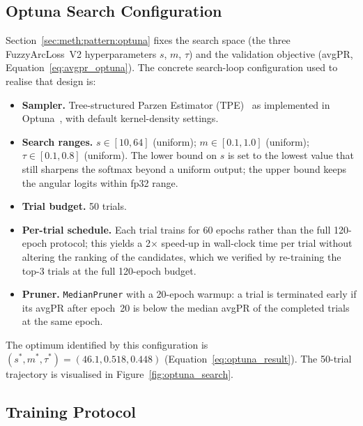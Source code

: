 \subsection{Optuna Search Configuration}
\label{sec:impl:pattern:optuna_config}

Section~\ref{sec:meth:pattern:optuna} fixes the search space (the
three FuzzyArcLoss~V2 hyperparameters $s$, $m$, $\tau$) and the
validation objective (avgPR, Equation~\ref{eq:avgpr_optuna}).
The concrete search-loop configuration used to realise that design is:
\begin{itemize}
    \item \textbf{Sampler.} Tree-structured Parzen Estimator
    (TPE)~\cite{bergstra2011tpe} as implemented in
    Optuna~\cite{akiba2019optuna}, with default kernel-density
    settings.
    \item \textbf{Search ranges.}
    $s \in [10, 64]$ (uniform); $m \in [0.1, 1.0]$ (uniform);
    $\tau \in [0.1, 0.8]$ (uniform).
    The lower bound on $s$ is set to the lowest value that still
    sharpens the softmax beyond a uniform output; the upper bound
    keeps the angular logits within fp32 range.
    \item \textbf{Trial budget.} 50 trials.
    \item \textbf{Per-trial schedule.} Each trial trains for 60 epochs
    rather than the full 120-epoch protocol; this yields a 2$\times$
    speed-up in wall-clock time per trial without altering the
    ranking of the candidates, which we verified by re-training the
    top-3 trials at the full 120-epoch budget.
    \item \textbf{Pruner.} \texttt{MedianPruner} with a 20-epoch
    warmup: a trial is terminated early if its avgPR after epoch~20
    is below the median avgPR of the completed trials at the same
    epoch.
\end{itemize}
The optimum identified by this configuration is
$(s^*, m^*, \tau^*) = (46.1, 0.518, 0.448)$
(Equation~\ref{eq:optuna_result}).
The 50-trial trajectory is visualised in
Figure~\ref{fig:optuna_search}.

\subsection{Training Protocol}
\label{sec:impl:pattern:training_protocol}

